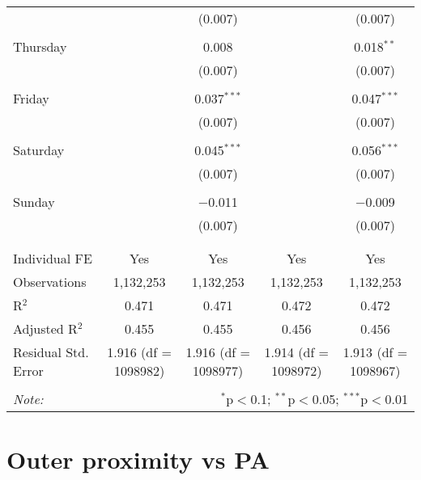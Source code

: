 \documentclass[
]{article}
\begin{document}
\begin{table}[!htbp]
{\begin{tabular}{@{\extracolsep{5pt}}lcccc}
  &  & (0.007) &  & (0.007) \\ 
  & & & & \\ 
 Thursday &  & 0.008 &  & 0.018$^{**}$ \\ 
  &  & (0.007) &  & (0.007) \\ 
  & & & & \\ 
 Friday &  & 0.037$^{***}$ &  & 0.047$^{***}$ \\ 
  &  & (0.007) &  & (0.007) \\ 
  & & & & \\ 
 Saturday &  & 0.045$^{***}$ &  & 0.056$^{***}$ \\ 
  &  & (0.007) &  & (0.007) \\ 
  & & & & \\ 
 Sunday &  & $-$0.011 &  & $-$0.009 \\ 
  &  & (0.007) &  & (0.007) \\ 
  & & & & \\ 
\hline \\[-1.8ex] 
Individual FE & Yes & Yes & Yes & Yes \\ 
Observations & 1,132,253 & 1,132,253 & 1,132,253 & 1,132,253 \\ 
R$^{2}$ & 0.471 & 0.471 & 0.472 & 0.472 \\ 
Adjusted R$^{2}$ & 0.455 & 0.455 & 0.456 & 0.456 \\ 
Residual Std. Error & 1.916 (df = 1098982) & 1.916 (df = 1098977) & 1.914 (df = 1098972) & 1.913 (df = 1098967) \\ 
\hline 
\hline \\[-1.8ex] 
\textit{Note:}  & \multicolumn{4}{r}{$^{*}$p$<$0.1; $^{**}$p$<$0.05; $^{***}$p$<$0.01} \\ 
\end{tabular}
} 
\end{table} 
\newpage
\section{Outer proximity vs PA}
\end{document}
